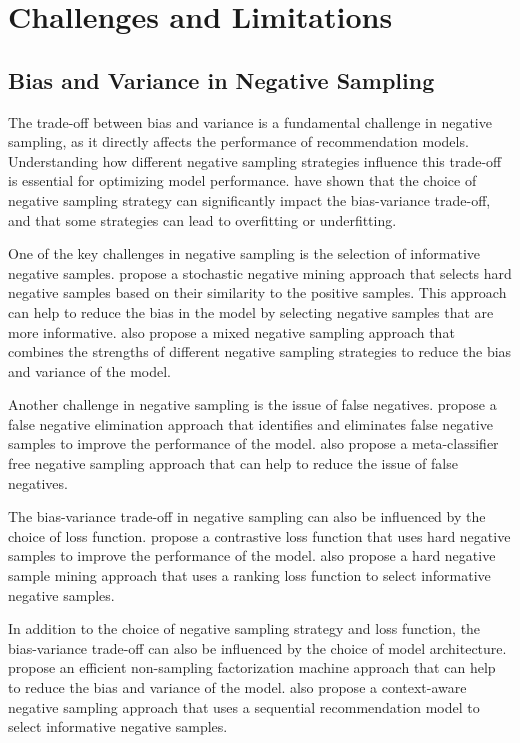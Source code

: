 \documentclass[11pt,a4paper]{article}
\begin{document}
\section{Challenges and Limitations}



\subsection{Bias and Variance in Negative Sampling}


The trade-off between bias and variance is a fundamental challenge in negative sampling, as it directly affects the performance of recommendation models. Understanding how different negative sampling strategies influence this trade-off is essential for optimizing model performance. \cite{doi:10.1145/3097983.3098202} have shown that the choice of negative sampling strategy can significantly impact the bias-variance trade-off, and that some strategies can lead to overfitting or underfitting.

One of the key challenges in negative sampling is the selection of informative negative samples. \cite{arxiv:1810.07076} propose a stochastic negative mining approach that selects hard negative samples based on their similarity to the positive samples. This approach can help to reduce the bias in the model by selecting negative samples that are more informative. \cite{doi:10.1145/3366424.3386195} also propose a mixed negative sampling approach that combines the strengths of different negative sampling strategies to reduce the bias and variance of the model.

Another challenge in negative sampling is the issue of false negatives. \cite{doi:10.1145/3581783.3612101} propose a false negative elimination approach that identifies and eliminates false negative samples to improve the performance of the model. \cite{doi:10.1007/s10994-023-06468-w} also propose a meta-classifier free negative sampling approach that can help to reduce the issue of false negatives.

The bias-variance trade-off in negative sampling can also be influenced by the choice of loss function. \cite{arxiv:2010.04592} propose a contrastive loss function that uses hard negative samples to improve the performance of the model. \cite{doi:10.1007/978-3-031-72083-3_14} also propose a hard negative sample mining approach that uses a ranking loss function to select informative negative samples.

In addition to the choice of negative sampling strategy and loss function, the bias-variance trade-off can also be influenced by the choice of model architecture. \cite{doi:10.1145/3366423.3380303} propose an efficient non-sampling factorization machine approach that can help to reduce the bias and variance of the model. \cite{doi:10.1109/access.2025.3576124} also propose a context-aware negative sampling approach that uses a sequential recommendation model to select informative negative samples.
\end{document}
